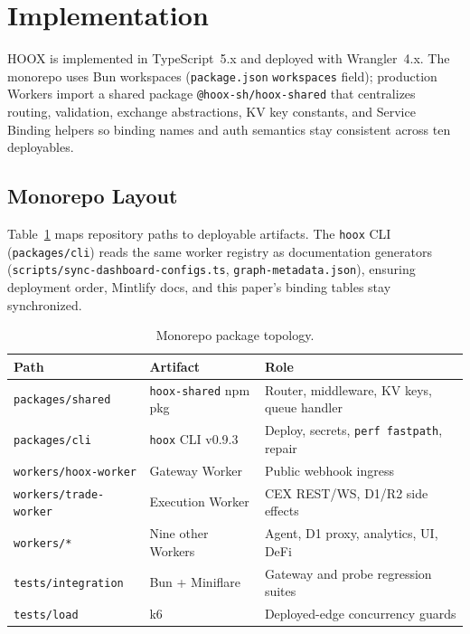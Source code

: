 \section{Implementation}
\label{sec:implementation}

\textsc{HOOX} is implemented in TypeScript~5.x and deployed with Wrangler~4.x. The monorepo uses Bun workspaces (\texttt{package.json} \texttt{workspaces} field); production Workers import a shared package \texttt{@hoox-sh/hoox-shared} that centralizes routing, validation, exchange abstractions, KV key constants, and Service Binding helpers so binding names and auth semantics stay consistent across ten deployables.

\subsection{Monorepo Layout}

Table~\ref{tab:monorepo-layout} maps repository paths to deployable artifacts. The \texttt{hoox} CLI (\texttt{packages/cli}) reads the same worker registry as documentation generators (\texttt{scripts/sync-dashboard-configs.ts}, \texttt{graph-metadata.json}), ensuring deployment order, Mintlify docs, and this paper's binding tables stay synchronized.

\begin{table}[t]
  \centering
  \caption{Monorepo package topology.}
  \label{tab:monorepo-layout}
  \small
  \begin{tabular*}{\linewidth}{@{\extracolsep{\fill}}llp{6cm}@{}}
    \toprule
    \textbf{Path} & \textbf{Artifact} & \textbf{Role} \\
    \midrule
    \texttt{packages/shared} & \texttt{hoox-shared} npm pkg & Router, middleware, KV keys, queue handler \\
    \texttt{packages/cli} & \texttt{hoox} CLI v0.9.3 & Deploy, secrets, \texttt{perf fastpath}, repair \\
    \texttt{workers/hoox-worker} & Gateway Worker & Public webhook ingress \\
    \texttt{workers/trade-worker} & Execution Worker & CEX REST/WS, D1/R2 side effects \\
    \texttt{workers/*} & Nine other Workers & Agent, D1 proxy, analytics, UI, DeFi \\
    \texttt{tests/integration} & Bun + Miniflare & Gateway and probe regression suites \\
    \texttt{tests/load} & k6 & Deployed-edge concurrency guards \\
    \bottomrule
  \end{tabular*}
\end{table}

